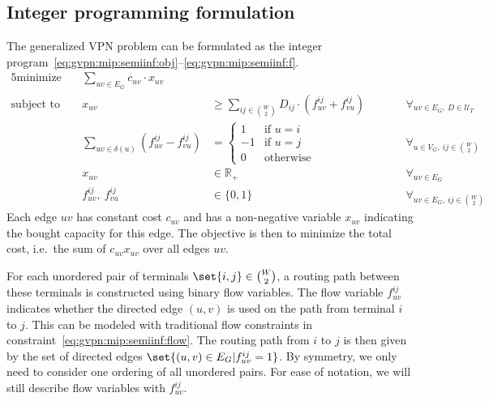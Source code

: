 \subsection{Integer programming formulation}
The generalized VPN problem can be formulated as the integer program~\eqref{eq:gvpn:mip:semiinf:obj}--\eqref{eq:gvpn:mip:semiinf:f}.
\begin{alignat}{5}
    \text{minimize}\ && \sum_{uv \in E_G} c_{uv} \cdot x_{uv} &&& \label{eq:gvpn:mip:semiinf:obj}\\
    \text{subject to}\ && x_{uv} &\ge \sum_{ij \in \binom{W}{2}} D_{ij} \cdot (f_{uv}^{ij} + f_{vu}^{ij}) &&\qquad \forall_{uv \in E_G,\ D \in \mathcal U_T} \label{eq:gvpn:mip:semiinf:demand}\\
    && \sum_{uv \in \delta(u)} (f_{uv}^{ij} - f_{vu}^{ij}) &= \begin{cases}
                                                                  1 & \text{if $u = i$} \\
                                                                  -1 & \text{if $u = j$} \\
                                                                  0 & \text{otherwise}
    \end{cases} &&\qquad \forall_{u \in V_G,\ ij \in \binom{W}{2}} \label{eq:gvpn:mip:semiinf:flow}\\
    && x_{uv} &\in \mathbb{R}_+ &&\qquad \forall_{uv \in E_G} \label{eq:gvpn:mip:semiinf:x}\\
    && f_{uv}^{ij},\ f_{vu}^{ij} &\in \{ 0, 1 \} &&\qquad \forall_{uv \in E_G,\ ij \in \binom{W}{2}} \label{eq:gvpn:mip:semiinf:f}
\end{alignat}
Each edge $uv$ has constant cost $c_{uv}$ and has a non-negative variable $x_{uv}$ indicating the bought capacity for this edge.
The objective is then to minimize the total cost, i.e.\ the sum of $c_{uv} x_{uv}$ over all edges $uv$.

For each unordered pair of terminals $\set{i, j} \in \binom W 2$, a routing path between these terminals is constructed using binary flow variables.
The flow variable $f_{uv}^{ij}$ indicates whether the directed edge $(u, v)$ is used on the path from terminal $i$ to $j$.
This can be modeled with traditional flow constraints in constraint~\eqref{eq:gvpn:mip:semiinf:flow}.
The routing path from $i$ to $j$ is then given by the set of directed edges $\set{(u, v) \in E_G | f_{uv}^{ij} = 1}$.
By symmetry, we only need to consider one ordering of all unordered pairs.
For ease of notation, we will still describe flow variables with $f_{uv}^{ij}$.

